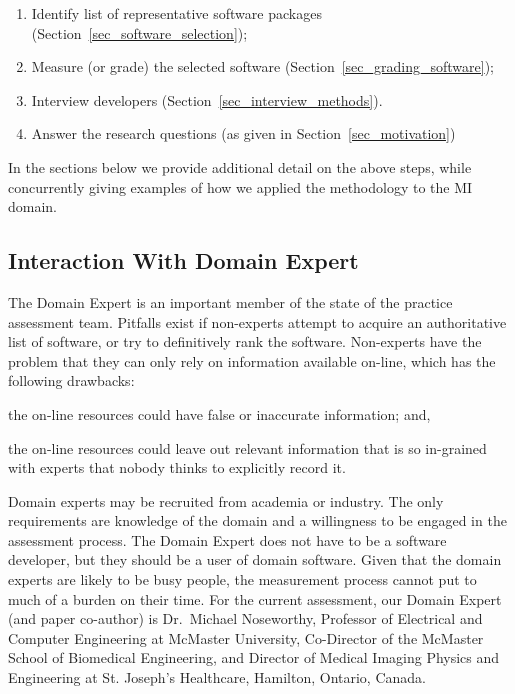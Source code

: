 \documentclass[final, 3p, times, authoryear]{elsarticle}
\begin{document}
\begin{enumerate}
\item Identify list of representative software packages
(Section~\ref{sec_software_selection});
\item Measure (or grade) the selected software (Section~\ref{sec_grading_software});
\item Interview developers (Section~\ref{sec_interview_methods}).
\item Answer the research questions (as given in Section~\ref{sec_motivation})
\end{enumerate}

In the sections below we provide additional detail on the above steps, while
concurrently giving examples of how we applied the methodology to the MI domain.

\subsection{Interaction With Domain Expert} \label{sec_vet_software_list}

The Domain Expert is an important member of the state of the practice assessment
team. Pitfalls exist if non-experts attempt to acquire an authoritative list of
software, or try to definitively rank the software. Non-experts have the problem
that they can only rely on information available on-line, which has the
following drawbacks:
\begin{inparaenum}[i)]
  \item the on-line resources could have false or inaccurate information; and,
  \item the on-line resources could leave out relevant information that is so
in-grained with experts that nobody thinks to explicitly record it.
\end{inparaenum}

Domain experts may be recruited from academia or industry.  The only
requirements are knowledge of the domain and a willingness to be engaged in the
assessment process.  The Domain Expert does not have to be a software developer,
but they should be a user of domain software.  Given that the domain experts are
likely to be busy people, the measurement process cannot put to much of a burden
on their time.  For the current assessment, our Domain Expert (and paper
co-author) is Dr.\ Michael Noseworthy, Professor of Electrical and Computer
Engineering at McMaster University, Co-Director of the McMaster School of
Biomedical Engineering, and Director of Medical Imaging Physics and Engineering
at St. Joseph’s Healthcare, Hamilton, Ontario, Canada.  
\end{document}
